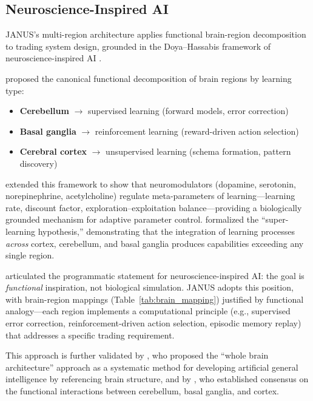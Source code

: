 \documentclass[12pt, a4paper]{article}
\begin{document}
\subsection{Neuroscience-Inspired AI}
\label{sec:rw_neuroscience}

JANUS's multi-region architecture applies functional brain-region decomposition to trading system design, grounded in the Doya--Hassabis framework of neuroscience-inspired AI \citep{doya1999computations, hassabis2017neuroscience}.

\citet{doya1999computations} proposed the canonical functional decomposition of brain regions by learning type:

\begin{itemize}
	\item \textbf{Cerebellum} $\rightarrow$ supervised learning (forward models, error correction)
	\item \textbf{Basal ganglia} $\rightarrow$ reinforcement learning (reward-driven action selection)
	\item \textbf{Cerebral cortex} $\rightarrow$ unsupervised learning (schema formation, pattern discovery)
\end{itemize}

\citet{doya2002metalearning} extended this framework to show that neuromodulators (dopamine, serotonin, norepinephrine, acetylcholine) regulate meta-parameters of learning---learning rate, discount factor, exploration--exploitation balance---providing a biologically grounded mechanism for adaptive parameter control. \citet{caligiore2019superlearning} formalized the ``super-learning hypothesis,'' demonstrating that the integration of learning processes \textit{across} cortex, cerebellum, and basal ganglia produces capabilities exceeding any single region.

\citet{hassabis2017neuroscience} articulated the programmatic statement for neuroscience-inspired AI: the goal is \textit{functional} inspiration, not biological simulation. JANUS adopts this position, with brain-region mappings (Table~\ref{tab:brain_mapping}) justified by functional analogy---each region implements a computational principle (e.g., supervised error correction, reinforcement-driven action selection, episodic memory replay) that addresses a specific trading requirement.

This approach is further validated by \citet{yamakawa2021whole}, who proposed the ``whole brain architecture'' approach as a systematic method for developing artificial general intelligence by referencing brain structure, and by \citet{caligiore2017consensus}, who established consensus on the functional interactions between cerebellum, basal ganglia, and cortex.
\end{document}
